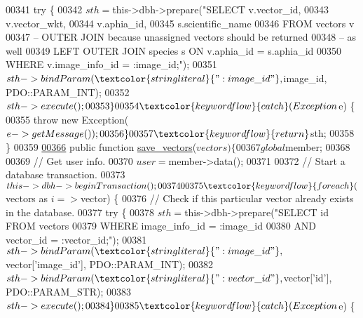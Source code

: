 \begin{DoxyCode}
{00341         \textcolor{keywordflow}{try} \{
00342             $sth = $this->dbh->prepare(\textcolor{stringliteral}{"SELECT v.vector\_id,}
00343 \textcolor{stringliteral}{                v.vector\_wkt,}
00344 \textcolor{stringliteral}{                v.aphia\_id,}
00345 \textcolor{stringliteral}{                s.scientific\_name}
00346 \textcolor{stringliteral}{            FROM vectors v}
00347 \textcolor{stringliteral}{                -- OUTER JOIN because unassigned vectors should be returned}
00348 \textcolor{stringliteral}{                -- as well}
00349 \textcolor{stringliteral}{                LEFT OUTER JOIN species s ON v.aphia\_id = s.aphia\_id}
00350 \textcolor{stringliteral}{            WHERE v.image\_info\_id = :image\_id;"});
00351             $sth->bindParam(\textcolor{stringliteral}{":image\_id"}, $image\_id, PDO::PARAM\_INT);
00352             $sth->execute();
00353         \}
00354         \textcolor{keywordflow}{catch} (Exception $e) \{
00355             \textcolor{keywordflow}{throw} \textcolor{keyword}{new} Exception( $e->getMessage() );
00356         \}
00357         \textcolor{keywordflow}{return} $sth;
00358     \}
00359 
\hypertarget{Database_8php_source_l00366}{}\hyperlink{classDatabase_a9cbb05bd40bab06c6d1900b9e1905613}{00366}     \textcolor{keyword}{public} \textcolor{keyword}{function} \hyperlink{classDatabase_a9cbb05bd40bab06c6d1900b9e1905613}{save\_vectors}($vectors) \{
00367         global $member;
00368 
00369         \textcolor{comment}{// Get user info.}
00370         $user = $member->data();
00371 
00372         \textcolor{comment}{// Start a database transaction.}
00373         $this->dbh->beginTransaction();
00374 
00375         \textcolor{keywordflow}{foreach} ($vectors as $i => $vector) \{
00376             \textcolor{comment}{// Check if this particular vector already exists in the database.}
00377             \textcolor{keywordflow}{try} \{
00378                 $sth = $this->dbh->prepare(\textcolor{stringliteral}{"SELECT id FROM vectors}
00379 \textcolor{stringliteral}{                    WHERE image\_info\_id = :image\_id}
00380 \textcolor{stringliteral}{                        AND vector\_id = :vector\_id;"});
00381                 $sth->bindParam(\textcolor{stringliteral}{":image\_id"}, $vector[\textcolor{stringliteral}{'image\_id'}], 
      PDO::PARAM\_INT);
00382                 $sth->bindParam(\textcolor{stringliteral}{":vector\_id"}, $vector[\textcolor{stringliteral}{'id'}], PDO::PARAM\_STR);
00383                 $sth->execute();
00384             \}
00385             \textcolor{keywordflow}{catch} (Exception $e) \{
}
\end{DoxyCode}

